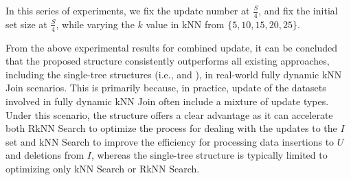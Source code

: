  In this series of experiments, we fix the update number at $\frac{S}{4}$, and fix the initial set size at $\frac{S}{4}$, while varying the $k$ value in kNN from $\{5,10,15,20,25\}$.

From the above experimental results for combined update, it can be concluded that the proposed \dualtree structure consistently outperforms all existing approaches, including the single-tree structures (i.e., \deltatree and \hdrtree), in real-world fully dynamic kNN Join scenarios. This is primarily because, in practice, update of the datasets involved in fully dynamic kNN Join often include a mixture of update types. Under this scenario, the \dualtree structure offers a clear advantage as it can accelerate both RkNN Search to optimize the process for dealing with the updates to the $I$ set and kNN Search to improve the efficiency for processing data insertions to $U$ and deletions from $I$, whereas the single-tree structure is typically limited to optimizing only kNN Search or RkNN Search.






